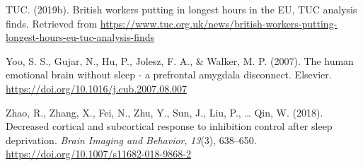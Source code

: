 \documentclass[
  english,
  man]{apa6}
\newlength{\cslhangindent}
\newenvironment{cslreferences}%
  {\setlength{\parindent}{0pt}%
  \everypar{\setlength{\hangindent}{\cslhangindent}}\ignorespaces}%
  {\par}
\begin{document}
\begin{cslreferences}
\leavevmode\hypertarget{ref-TUC1}{}%
TUC. (2019b). British workers putting in longest hours in the EU, TUC analysis finds. Retrieved from \url{https://www.tuc.org.uk/news/british-workers-putting-longest-hours-eu-tuc-analysis-finds}

\leavevmode\hypertarget{ref-Yoo2007a}{}%
Yoo, S. S., Gujar, N., Hu, P., Jolesz, F. A., \& Walker, M. P. (2007). The human emotional brain without sleep - a prefrontal amygdala disconnect. Elsevier. \url{https://doi.org/10.1016/j.cub.2007.08.007}

\leavevmode\hypertarget{ref-Zhao2018}{}%
Zhao, R., Zhang, X., Fei, N., Zhu, Y., Sun, J., Liu, P., \ldots{} Qin, W. (2018). Decreased cortical and subcortical response to inhibition control after sleep deprivation. \emph{Brain Imaging and Behavior}, \emph{13}(3), 638--650. \url{https://doi.org/10.1007/s11682-018-9868-2}
\end{cslreferences}

\endgroup
\end{document}
